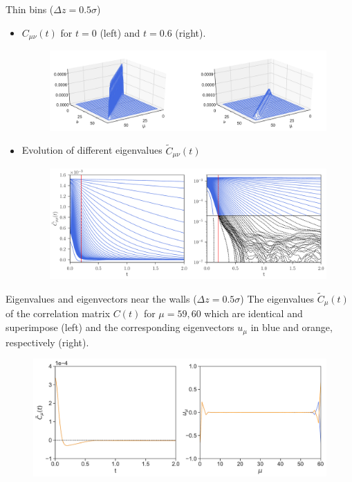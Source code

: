 \documentclass{beamer}
\begin{document}
\begin{frame}{Thin bins ($\Delta z=0.5\sigma$)}
  \begin{itemize}
    \item $C_{\mu\nu}(t)$ for  $t=0$ (left) and $t=0.6$ (right).
\begin{figure}[h!]
\includegraphics[width=\linewidth]{Ct-matrix-WALLS-66nodes}
\end{figure}
\item Evolution of different eigenvalues $\tilde{C}_{\mu\nu}(t)$
\begin{figure}[h!]
  \includegraphics[width=\linewidth]{CtRec-WALLS-66nodes-exp}
\end{figure}
\end{itemize}
\end{frame}

\begin{frame}{Eigenvalues and eigenvectors near the walls ($\Delta z=0.5\sigma$)}
    The eigenvalues $\tilde{C}_{\mu}(t)$ of the correlation matrix $C(t)$ for $\mu=59,60$ which are identical and superimpose (left) and the corresponding eigenvectors $u_{\mu}$ in blue and orange, respectively (right).
  \begin{figure}[h!]
\includegraphics[width=1\linewidth]{EigenvaluesVectors-WALLS-66nodes}
\end{figure}
\end{frame}
\end{document}
